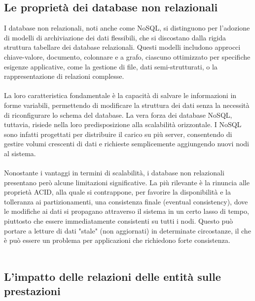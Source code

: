 \subsection {Le proprietà dei database non relazionali}

I database non relazionali, noti anche come NoSQL, 
si distinguono per l'adozione di modelli di archiviazione dei dati flessibili, 
che si discostano dalla rigida struttura tabellare dei database relazionali. 
Questi modelli includono approcci chiave-valore, documento, colonnare e a grafo, 
ciascuno ottimizzato per specifiche esigenze applicative, 
come la gestione di file, dati semi-strutturati, o la rappresentazione di relazioni complesse.\\
\\
La loro caratteristica fondamentale è la capacità di salvare le informazioni in forme variabili, 
permettendo di modificare la struttura dei dati senza la necessità di riconfigurare lo schema del database. 
La vera forza dei database NoSQL, tuttavia, risiede nella loro predisposizione alla scalabilità orizzontale. 
I NoSQL sono infatti progettati per distribuire il carico su più server, 
consentendo di gestire volumi crescenti di dati e richieste semplicemente aggiungendo nuovi nodi al sistema.\\
\\
Nonostante i vantaggi in termini di scalabilità, 
i database non relazionali presentano però alcune limitazioni significative. 
La più rilevante è la rinuncia alle proprietà ACID, alla quale si contrappone, 
per favorire la disponibilità e la tolleranza ai partizionamenti, 
una consistenza finale (eventual consistency), 
dove le modifiche ai dati si propagano attraverso il sistema in un certo lasso di tempo, 
piuttosto che essere immediatamente consistenti su tutti i nodi.
Questo può portare a letture di dati "stale" (non aggiornati) in determinate circostanze, 
il che è può essere un problema per applicazioni che richiedono forte consistenza.\\
\\



\subsection{L'impatto delle relazioni delle entità sulle prestazioni}

